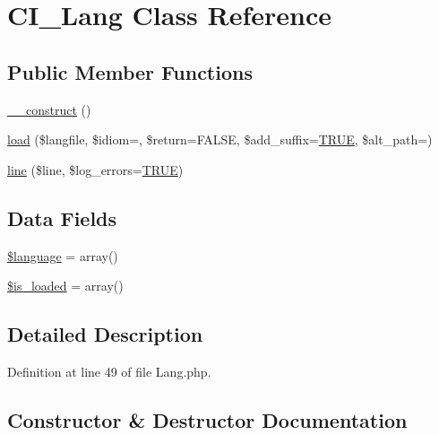 \hypertarget{class_c_i___lang}{}\section{C\+I\+\_\+\+Lang Class Reference}
\label{class_c_i___lang}
\subsection*{Public Member Functions}
\begin{DoxyCompactItemize}
\item 
\mbox{\hyperlink{class_c_i___lang_a095c5d389db211932136b53f25f39685}{\+\_\+\+\_\+construct}} ()
\item 
\mbox{\hyperlink{class_c_i___lang_a38b49b0297816c583824cefbc30d0217}{load}} (\$langfile, \$idiom=\textquotesingle{}\textquotesingle{}, \$return=F\+A\+L\+SE, \$add\+\_\+suffix=\mbox{\hyperlink{constants_8php_ae04a3efe6aa42044f803ee90c2277846}{T\+R\+UE}}, \$alt\+\_\+path=\textquotesingle{}\textquotesingle{})
\item 
\mbox{\hyperlink{class_c_i___lang_a60a06468111224f49dd5cd51e5dc1410}{line}} (\$line, \$log\+\_\+errors=\mbox{\hyperlink{constants_8php_ae04a3efe6aa42044f803ee90c2277846}{T\+R\+UE}})
\end{DoxyCompactItemize}
\subsection*{Data Fields}
\begin{DoxyCompactItemize}
\item 
\mbox{\hyperlink{class_c_i___lang_a83170d318260a5a2e2a79dccdd371b10}{\$language}} = array()
\item 
\mbox{\hyperlink{class_c_i___lang_a908e9ad52a5d1956d360689452f6bdbe}{\$is\+\_\+loaded}} = array()
\end{DoxyCompactItemize}


\subsection{Detailed Description}


Definition at line 49 of file Lang.\+php.



\subsection{Constructor \& Destructor Documentation}
\mbox{\label{class_c_i___lang_a095c5d389db211932136b53f25f39685}} 
